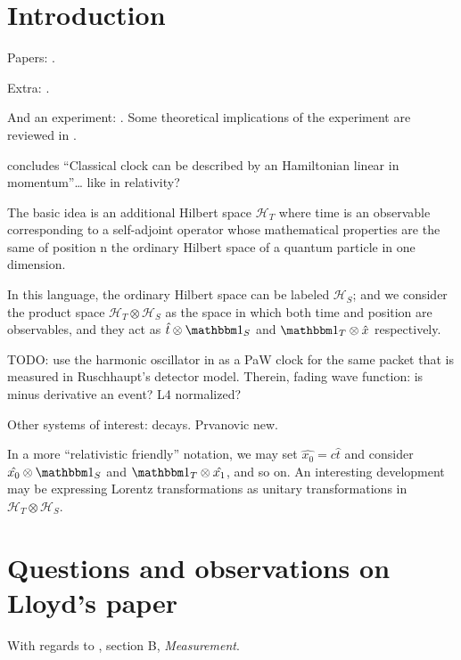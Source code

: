\section{Introduction}

Papers: \cite{Lloyd:Time, Marletto:Evolution, Prvanovic, Maccone:Pauli, RealisticClocks, HarmonicClocks}.

Extra: \cite{TimeAnyons}.

And an experiment: \cite{Moreva:synthetic,Moreva:illustration}.
Some theoretical implications of the experiment are reviewed in
\cite{LeggettGarg+PageWootters}.

\cite{HarmonicClocks} concludes ``Classical clock can be described by an Hamiltonian linear in momentum''\dots
like in relativity?

The basic idea is an additional Hilbert space $\mathcal{H}_T$ where time is an observable
corresponding to
a self-adjoint operator whose mathematical properties are the same of position  n the
ordinary Hilbert space of a quantum particle in one dimension.

In this language, the ordinary Hilbert space can be labeled $\mathcal{H}_S$;
and we consider the product space $\mathcal{H}_T \otimes \mathcal{H}_S$ as
the space in which both time and position are observables, and they act as
$\hat{t} \otimes \idop_S$ and $\idop_T \otimes \hat{x}$
respectively.

TODO: use the harmonic oscillator in \cite{HarmonicClocks}
as a PaW clock for the same packet that is measured in
Ruschhaupt's detector model.
Therein, fading wave function: is minus derivative an event?
L4 normalized?

\iftodo
Other systems of interest: decays. Prvanovic new.
\fi

\begin{remark}
  In a more ``relativistic friendly'' notation, we may set
  $\hat{x_0} = c\hat{t}$ and consider
  $\hat{x_0} \otimes \idop_S$ and $\idop_T \otimes \hat{x_1}$,
  and so on. An interesting development may be expressing
  Lorentz transformations as unitary transformations in
  $\mathcal{H}_T \otimes \mathcal{H}_S$.
\end{remark}

\iftodo

\section{Questions and observations on Lloyd's paper}

With regards to \cite{Lloyd:Time}, section B, \textit{Measurement}.

